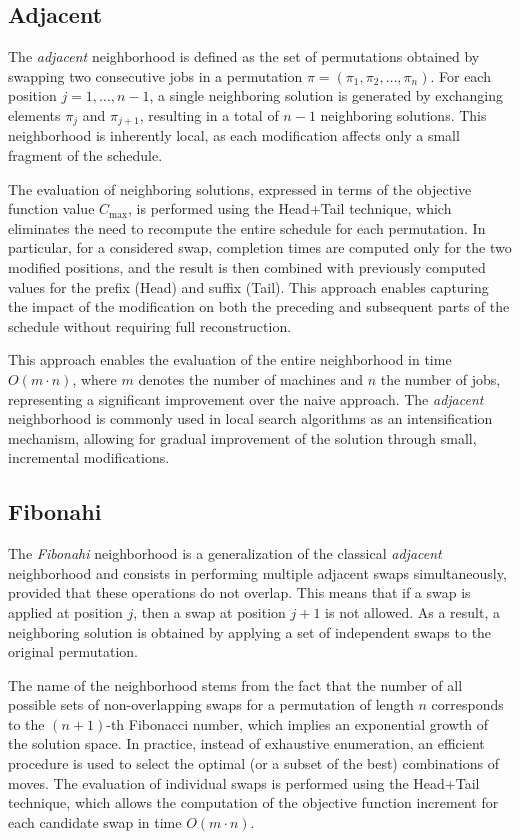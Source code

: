 \documentclass[10pt,twoside,twocolumn,a4paper]{article}
\begin{document}
\subsection{Adjacent}
The \emph{adjacent} neighborhood is defined as the set of permutations obtained by swapping two consecutive jobs in a permutation $\pi = (\pi_1, \pi_2, \dots, \pi_n)$. For each position $j = 1, \dots, n-1$, a single neighboring solution is generated by exchanging elements $\pi_j$ and $\pi_{j+1}$, resulting in a total of $n-1$ neighboring solutions. This neighborhood is inherently local, as each modification affects only a small fragment of the schedule.

The evaluation of neighboring solutions, expressed in terms of the objective function value $C_{\max}$, is performed using the Head+Tail technique, which eliminates the need to recompute the entire schedule for each permutation. In particular, for a considered swap, completion times are computed only for the two modified positions, and the result is then combined with previously computed values for the prefix (Head) and suffix (Tail). This approach enables capturing the impact of the modification on both the preceding and subsequent parts of the schedule without requiring full reconstruction.

This approach enables the evaluation of the entire neighborhood in time $O(m \cdot n)$, where $m$ denotes the number of machines and $n$ the number of jobs, representing a significant improvement over the naive approach. The \emph{adjacent} neighborhood is commonly used in local search algorithms as an intensification mechanism, allowing for gradual improvement of the solution through small, incremental modifications.


\subsection{Fibonahi}
The \emph{Fibonahi} neighborhood is a generalization of the classical \emph{adjacent} neighborhood and consists in performing multiple adjacent swaps simultaneously, provided that these operations do not overlap. This means that if a swap is applied at position $j$, then a swap at position $j+1$ is not allowed. As a result, a neighboring solution is obtained by applying a set of independent swaps to the original permutation.

The name of the neighborhood stems from the fact that the number of all possible sets of non-overlapping swaps for a permutation of length $n$ corresponds to the $(n+1)$-th Fibonacci number, which implies an exponential growth of the solution space. In practice, instead of exhaustive enumeration, an efficient procedure is used to select the optimal (or a subset of the best) combinations of moves. The evaluation of individual swaps is performed using the Head+Tail technique, which allows the computation of the objective function increment for each candidate swap in time $O(m \cdot n)$.
\end{document}
